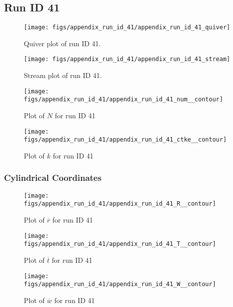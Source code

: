\subsection{Run ID 41}
\begin{figure}[H]
\centering
\texttt{[image: figs/appendix\_run\_id\_41/appendix\_run\_id\_41\_quiver]}
\caption{Quiver plot of run ID 41.}
\label{fig:appendix_run_id_41_quiver}
\end{figure}


\begin{figure}[H]
\centering
\texttt{[image: figs/appendix\_run\_id\_41/appendix\_run\_id\_41\_stream]}
\caption{Stream plot of run ID 41.}
\label{fig:appendix_run_id_41_stream}
\end{figure}


\begin{figure}[H]
\centering
\texttt{[image: figs/appendix\_run\_id\_41/appendix\_run\_id\_41\_num\_\_contour]}
\caption{Plot of $N$ for run ID 41}
\label{fig:appendix_run_id_41_num__contour}
\end{figure}


\begin{figure}[H]
\centering
\texttt{[image: figs/appendix\_run\_id\_41/appendix\_run\_id\_41\_ctke\_\_contour]}
\caption{Plot of $k$ for run ID 41}
\label{fig:appendix_run_id_41_ctke__contour}
\end{figure}


\subsubsection{Cylindrical Coordinates}
\begin{figure}[H]
\centering
\texttt{[image: figs/appendix\_run\_id\_41/appendix\_run\_id\_41\_R\_\_contour]}
\caption{Plot of $\overline{r}$ for run ID 41}
\label{fig:appendix_run_id_41_R__contour}
\end{figure}


\begin{figure}[H]
\centering
\texttt{[image: figs/appendix\_run\_id\_41/appendix\_run\_id\_41\_T\_\_contour]}
\caption{Plot of $\overline{t}$ for run ID 41}
\label{fig:appendix_run_id_41_T__contour}
\end{figure}


\begin{figure}[H]
\centering
\texttt{[image: figs/appendix\_run\_id\_41/appendix\_run\_id\_41\_W\_\_contour]}
\caption{Plot of $\overline{w}$ for run ID 41}
\label{fig:appendix_run_id_41_W__contour}
\end{figure}


